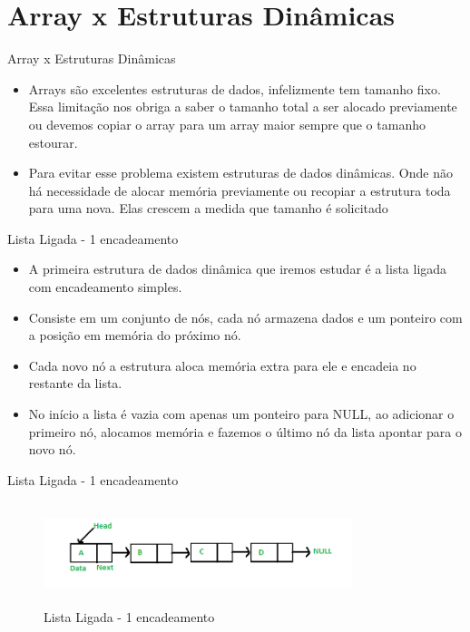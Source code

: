 \section{Array x Estruturas Dinâmicas}

\begin{frame}
	\begin{block}{Array x Estruturas Dinâmicas}
		\begin{itemize}
			\item Arrays são excelentes estruturas de dados, infelizmente tem tamanho fixo. Essa limitação nos obriga a saber o tamanho total a ser alocado previamente ou devemos copiar o array para um array maior sempre que o tamanho estourar.

			\item Para evitar esse problema existem estruturas de dados dinâmicas. Onde não há necessidade de alocar memória previamente ou recopiar a estrutura toda para uma nova. Elas crescem a medida que tamanho é solicitado
		\end{itemize}
	\end{block}
\end{frame}

\begin{frame}
	\begin{block}{Lista Ligada - 1 encadeamento}
		\begin{itemize}
			\item A primeira estrutura de dados dinâmica que iremos estudar é a lista ligada com encadeamento simples.
	
			\item Consiste em um conjunto de nós, cada nó armazena dados e um ponteiro com a posição em memória do próximo nó.
			
			\item Cada novo nó a estrutura aloca memória extra para ele e encadeia no restante da lista.
			
			\item No início a lista é vazia com apenas um ponteiro para NULL, ao adicionar o primeiro nó, alocamos memória e fazemos o último nó da lista apontar para o novo nó.
		\end{itemize}
	\end{block}
\end{frame}

\begin{frame}
	\begin{block}{Lista Ligada - 1 encadeamento}
		\begin{figure}[!htb]
			\centering	  				
			\includegraphics[height=3cm, width = 9cm]{./pic/LinkedlistUmEncadeamento.png}
			\caption{Lista Ligada - 1 encadeamento}
			\label{fig_LLS_one}
		\end{figure}
	\end{block}
\end{frame}

